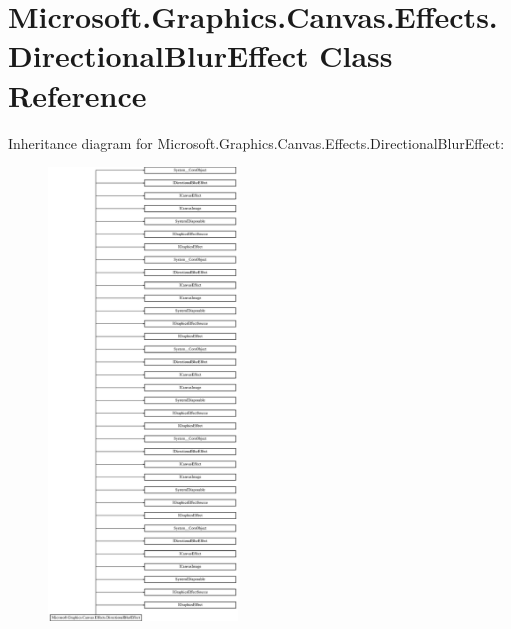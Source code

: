 \hypertarget{class_microsoft_1_1_graphics_1_1_canvas_1_1_effects_1_1_directional_blur_effect}{}\section{Microsoft.\+Graphics.\+Canvas.\+Effects.\+Directional\+Blur\+Effect Class Reference}
\label{class_microsoft_1_1_graphics_1_1_canvas_1_1_effects_1_1_directional_blur_effect}
Inheritance diagram for Microsoft.\+Graphics.\+Canvas.\+Effects.\+Directional\+Blur\+Effect\+:\begin{figure}[H]
\begin{center}
\leavevmode
\includegraphics[height=12.000000cm]{class_microsoft_1_1_graphics_1_1_canvas_1_1_effects_1_1_directional_blur_effect}
\end{center}
\end{figure}
